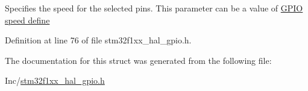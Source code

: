 Specifies the speed for the selected pins. This parameter can be a value of \hyperlink{group___g_p_i_o__speed__define}{G\+P\+IO speed define} 

Definition at line 76 of file stm32f1xx\+\_\+hal\+\_\+gpio.\+h.



The documentation for this struct was generated from the following file\+:\begin{DoxyCompactItemize}
\item 
Inc/\hyperlink{stm32f1xx__hal__gpio_8h}{stm32f1xx\+\_\+hal\+\_\+gpio.\+h}\end{DoxyCompactItemize}
